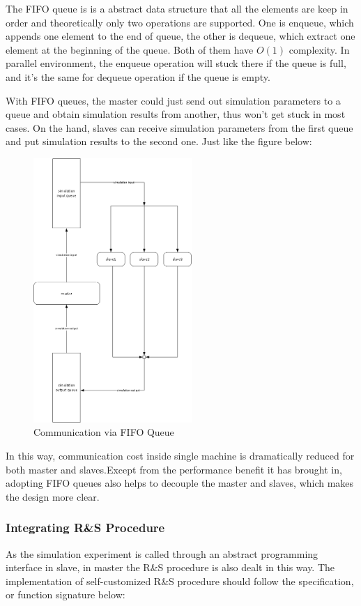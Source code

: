 The FIFO queue is is a abstract data structure that all the elements are keep in order and theoretically only two operations are supported. One is enqueue, which appends one element to the end of queue, the other is dequeue, which extract one element at the beginning of the queue. Both of them have $O(1)$ complexity. In parallel environment, the enqueue operation will stuck there if the queue is full, and it's the same for dequeue operation if the queue is empty.

With FIFO queues, the master could just send out simulation parameters to a queue and obtain simulation results from another, thus won't get stuck in most cases. On the hand, slaves can receive simulation parameters from the first queue and put simulation results to the second one. Just like the figure below:

\begin{figure}[ht]
\centering
\includegraphics[width=60mm]{master-slave-queue.png}
\caption{Communication via FIFO Queue}
\end{figure}

In this way, communication cost inside single machine is dramatically reduced for both master and slaves.Except from the performance benefit it has brought in, adopting FIFO queues also helps to decouple the master and slaves, which makes the design more clear.

\subsubsection{Integrating R\&S Procedure}

As the simulation experiment is called through an abstract programming interface in slave, in master the R\&S procedure is also dealt in this way. The implementation of self-customized R\&S procedure should follow the specification, or function signature below:

